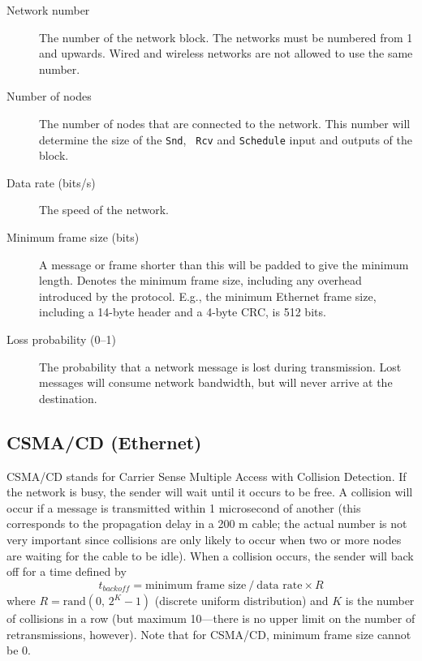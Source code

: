 \documentclass[final,twoside]{rapport}
\begin{document}
\begin{description}
\item[Network number] The number of the network block. The networks
  must be numbered from 1 and upwards. Wired and wireless networks are
  not allowed to use the same number.
\item[Number of nodes] The number of nodes that are connected to the
  network. This number will determine the size of the {\tt Snd}, {\tt
    Rcv} and {\tt Schedule} input and outputs of the block.
\item[Data rate (bits/s)] The speed of the network.
\item[Minimum frame size (bits)] A message or frame shorter than this
  will be padded to give the minimum length. Denotes the minimum frame
  size, including any overhead introduced by the protocol. E.g., the
  minimum Ethernet frame size, including a 14-byte header and a 4-byte
  CRC, is 512 bits.
\item[Loss probability (0--1)] The probability that a network message
  is lost during transmission. Lost messages will consume network
  bandwidth, but will never arrive at the destination.
\end{description}

\subsection{CSMA/CD (Ethernet)}
CSMA/CD stands for Carrier Sense Multiple Access with Collision
Detection. If the network is busy, the sender will wait until it
occurs to be free. A collision will occur if a message
is transmitted  within 1 microsecond of another (this corresponds to
the propagation delay in a 200 m cable; the actual number is not very
important since collisions are only likely to occur when two or more
nodes are waiting for the cable to be idle). When a collision occurs,
the sender will back off for a time defined by
\[
t_\mathit{backoff} = \text{minimum frame size} \ /\  \text{data rate} \times R
\]
where $R = \mathrm{rand}(0,\,2^K-1)$ (discrete uniform distribution) and
$K$ is the number of collisions in a row (but maximum 10---there is no
upper limit on the number of retransmissions, however). Note that for
CSMA/CD, minimum frame size cannot be 0.
\end{document}
